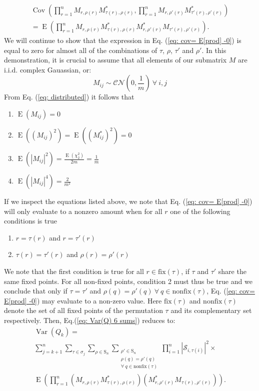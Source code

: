 \documentclass[10pt,aps,pra,twocolumn,superscriptaddress]{revtex4-2}
\DeclareMathOperator{\E}{E}
\DeclareMathOperator{\Var}{Var}
\DeclareMathOperator{\Cov}{Cov}
\begin{document}
\begin{multline}
    \Cov\left(\prod_{r=1}^nM_{r,\rho(r)} M_{\tau(r),\rho(r)}^*,\prod_{r=1}^nM_{r,\rho'(r)} M_{\tau'(r),\rho'(r)}^*\right)\\
    =\E\left(\prod_{r=1}^nM_{r,\rho(r)} M_{\tau(r),\rho(r)}^*M^{*}_{r,\rho'(r)} M_{\tau'(r),\rho'(r)}\right).
    \label{eq: cov= E[prod]  -0}
\end{multline}
We will continue to show that the expression in Eq. (\ref{eq: cov= E[prod]  -0}) is equal to zero for almost all of the combinations of $\tau$, $\rho$, $\tau'$ and $\rho'$. In this demonstration, it is crucial to assume that all elements of our submatrix $M$ are i.i.d. complex Gauassian, or:
\begin{equation}
    M_{ij}\sim \mathcal{CN}(0,\frac{1}{m})\:\forall\:i,j
    \label{eq: distributed}
\end{equation}
From Eq. (\ref{eq: distributed}) it follows that 
\begin{enumerate}
    \item $\E\left(M_{ij}\right)=0$
    \item $\E\left((M_{ij})^2\right)=\E\left((M^{*}_{ij})^2\right)=0$
    \item $\E\left(|M_{ij}|^2\right)=\frac{\E(\chi^2_2)}{2m}=\frac{1}{m}$
    \item $\E\left(|M_{ij}|^4\right)=\frac{2}{m^2}$
\end{enumerate}
If we inspect the equations listed above, we note that Eq. (\ref{eq: cov= E[prod]  -0}) will only evaluate to a nonzero amount when for all $r$ one of the following conditions is true
\begin{enumerate}
\item $r=\tau(r)$ and $r=\tau'(r)$
\item $\tau(r)=\tau'(r)$ and $\rho(r)=\rho'(r)$
\end{enumerate}
We note that the first condition is true for all $r\in\mathrm{fix}(\tau)$, if $\tau$ and $\tau'$ share the same fixed points. For all non-fixed points, condition 2 must thus be true and we conclude that only if $\tau=\tau'$ and $\rho(q)=\rho'(q)\: \forall\:q\in \mathrm{nonfix}(\tau)$, Eq. (\ref{eq: cov= E[prod]  -0}) may evaluate to a non-zero value. Here $\mathrm{fix}(\tau)$ and $\mathrm{nonfix}(\tau)$ denote the set of all fixed points of the permutation $\tau$ and its complementary set respectively.
Then, Eq.(\ref{eq: Var(Q) 6 sums}) reduces to:
\begin{multline}
    \Var(Q_k)=\\
    \sum_{j=k+1}^n\sum_{\tau \in \sigma_j} \sum_{\rho\in\mathrm{S}_n}\sum_{\substack{\rho'\in\mathrm{S}_n\\\rho(q)=\rho'(q)\: \\\forall\:q\in \mathrm{nonfix}(\tau)}}\prod^n_{i=1}|\mathcal{S}_{i,\tau(i)}|^2\times\\
    \E\left(\prod_{r=1}^n(M_{r,\rho(r)} M_{\tau(r),\rho(r)}^*)(M^{*}_{r,\rho'(r)} M_{\tau(r),\rho'(r)})\right).
\end{multline}
\end{document}
